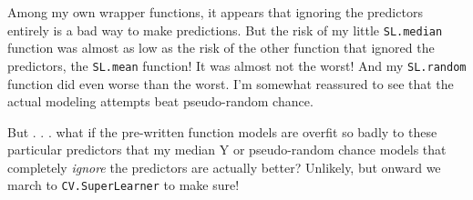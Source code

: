 \documentclass{article}\usepackage[]{graphicx}\usepackage[]{xcolor}
\begin{document}
\vspace{2mm}

Among my own wrapper functions, it appears that ignoring the predictors entirely is a bad way to make predictions. But the risk of my little \texttt{SL.median} function was almost as low as the risk of the other function that ignored the predictors, the \texttt{SL.mean} function! It was almost not the worst! And my \texttt{SL.random} function did even worse than the worst. I'm somewhat reassured to see that the actual modeling attempts beat pseudo-random chance. 

\vspace{2mm}

But . . . what if the pre-written function models are overfit so badly to these particular predictors that my median Y or pseudo-random chance models that completely \textit{ignore} the predictors are actually better? Unlikely, but onward we march to \texttt{CV.SuperLearner} to make sure!
\end{document}
